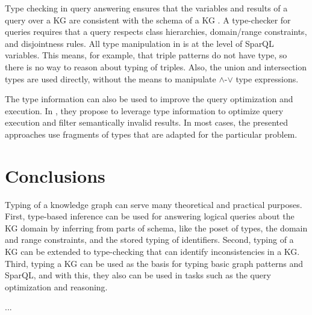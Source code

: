 \documentclass[runningheads]{llncs}
\begin{document}
Type checking in query answering ensures that the variables and
results of a query over a KG are consistent with the schema of a KG
\cite{Zhao2017,Zhang2019}. A type-checker for queries requires that a
query respects class hierarchies, domain/range constraints, and
disjointness rules. All type manipulation in \cite{Zhao2017,Zhang2019}
is at the level of SparQL \cite{sparql} variables. This means, for
example, that triple patterns do not have type, so there is no way to
reason about typing of triples. Also, the union and intersection types
are used directly, without the means to manipulate $\land$-$\lor$ type
expressions.

The type information can also be used to improve the query
optimization and execution. In \cite{Kollia2013}, they propose to
leverage type information to optimize query execution and filter
semantically invalid results. In most cases, the presented approaches
use fragments of types that are adapted for the particular problem.





\section{Conclusions\label{sec:conclude}}

Typing of a knowledge graph can serve many theoretical and practical
purposes. First, type-based inference can be used for answering
logical queries about the KG domain by inferring from parts
of schema, like the poset of types, the domain and range constraints,
and the stored typing of identifiers. Second, typing of a KG can be
extended to type-checking that can identify inconsistencies in a
KG. Third, typing a KG can be used as the basis for typing basic graph
patterns and SparQL, and with this, they also can be used in tasks
such as the query optimization and reasoning.


... \\





%



\end{document}
